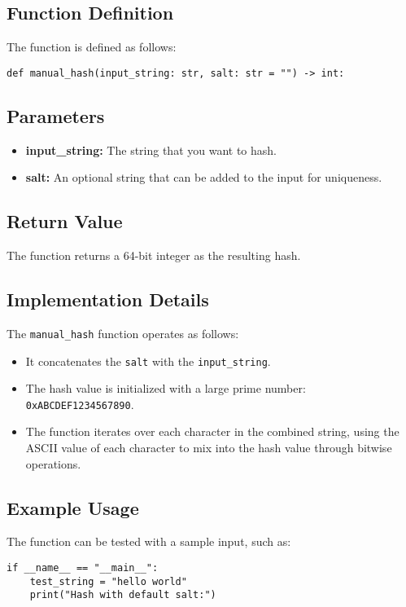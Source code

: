 \documentclass[a4paper, 12pt]{article}
\begin{document}
\subsection{Function Definition}
The function is defined as follows:

\begin{verbatim}
def manual_hash(input_string: str, salt: str = "") -> int:
\end{verbatim}

\subsection{Parameters}
\begin{itemize}
    \item \textbf{input\_string:} The string that you want to hash.
    \item \textbf{salt:} An optional string that can be added to the input for uniqueness.
\end{itemize}

\subsection{Return Value}
The function returns a 64-bit integer as the resulting hash.

\subsection{Implementation Details}
The \texttt{manual\_hash} function operates as follows:
\begin{itemize}
    \item It concatenates the \texttt{salt} with the \texttt{input\_string}.
    \item The hash value is initialized with a large prime number: \texttt{0xABCDEF1234567890}.
    \item The function iterates over each character in the combined string, using the ASCII value of each character to mix into the hash value through bitwise operations.
\end{itemize}

\subsection{Example Usage}
The function can be tested with a sample input, such as:
\begin{verbatim}
if __name__ == "__main__":
    test_string = "hello world"
    print("Hash with default salt:")
\end{verbatim}
\end{document}
